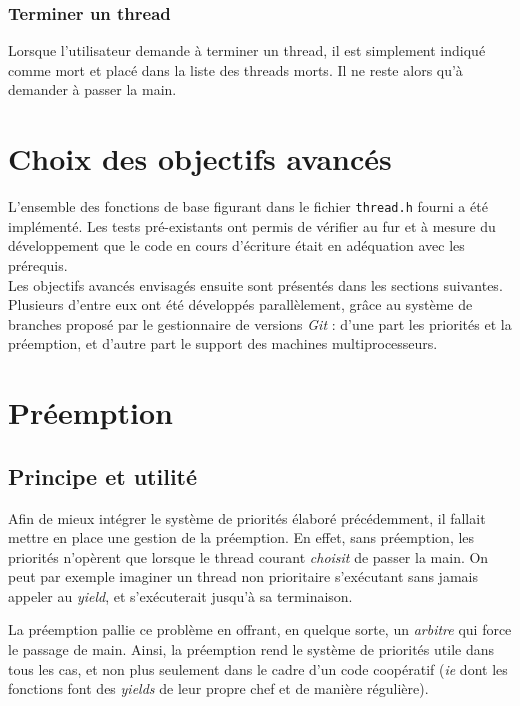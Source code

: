 \documentclass[a4paper,11pt]{article}
\begin{document}
\subsubsection*{Terminer un thread}

Lorsque l'utilisateur demande à terminer un thread, il est simplement indiqué comme mort et placé dans la liste des threads morts. Il ne reste alors qu'à demander à passer la main.





\section{Choix des objectifs avancés}

L’ensemble des fonctions de base figurant dans le fichier \texttt{thread.h} fourni a été implémenté. Les tests pré-existants ont permis de vérifier au fur et à mesure du développement que le code en cours
d’écriture était en adéquation avec les prérequis.\\

Les objectifs avancés envisagés ensuite sont présentés dans les sections suivantes. Plusieurs d'entre eux ont été développés parallèlement, grâce au système de branches proposé par le gestionnaire de versions \textit{Git} : d'une part les priorités et la préemption, et d'autre part le support des machines multiprocesseurs.

\section{Préemption}

\subsection{Principe et utilité}

Afin de mieux intégrer le système de priorités élaboré précédemment, il fallait mettre en place une gestion de la préemption. En effet, sans préemption, les priorités n'opèrent que lorsque le thread courant \textit{choisit} de passer la main. On peut par exemple imaginer un thread non prioritaire s'exécutant sans jamais appeler au \textit{yield}, et s'exécuterait jusqu'à sa terminaison.

La préemption pallie ce problème en offrant, en quelque sorte, un \textit{arbitre} qui force le passage de main. Ainsi, la préemption rend le système de priorités utile dans tous les cas, et non plus seulement dans le cadre d'un code coopératif (\textit{ie} dont les fonctions font des \textit{yields} de leur propre chef et de manière régulière).
\end{document}
